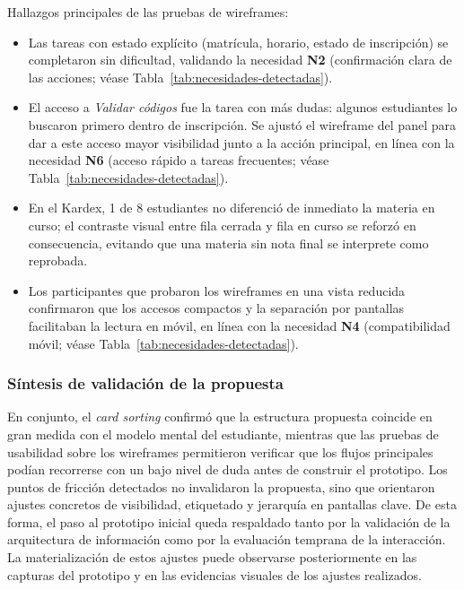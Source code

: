\noindent Hallazgos principales de las pruebas de wireframes:

\begin{itemize}
  \item Las tareas con estado explícito (matrícula, horario, estado de inscripción) se completaron sin dificultad, validando la necesidad \textbf{N2} (confirmación clara de las acciones; véase Tabla~\ref{tab:necesidades-detectadas}).
  \item El acceso a \textit{Validar códigos} fue la tarea con más dudas: algunos estudiantes lo buscaron primero dentro de inscripción. Se ajustó el wireframe del panel para dar a este acceso mayor visibilidad junto a la acción principal, en línea con la necesidad \textbf{N6} (acceso rápido a tareas frecuentes; véase Tabla~\ref{tab:necesidades-detectadas}).
  \item En el Kardex, 1 de 8 estudiantes no diferenció de inmediato la materia en curso; el contraste visual entre fila cerrada y fila en curso se reforzó en consecuencia, evitando que una materia sin nota final se interprete como reprobada.
  \item Los participantes que probaron los wireframes en una vista reducida confirmaron que los accesos compactos y la separación por pantallas facilitaban la lectura en móvil, en línea con la necesidad \textbf{N4} (compatibilidad móvil; véase Tabla~\ref{tab:necesidades-detectadas}).
\end{itemize}

\subsubsection*{Síntesis de validación de la propuesta}

En conjunto, el \textit{card sorting} confirmó que la estructura propuesta coincide en gran medida con el modelo mental del estudiante, mientras que las pruebas de usabilidad sobre los wireframes permitieron verificar que los flujos principales podían recorrerse con un bajo nivel de duda antes de construir el prototipo. Los puntos de fricción detectados no invalidaron la propuesta, sino que orientaron ajustes concretos de visibilidad, etiquetado y jerarquía en pantallas clave. De esta forma, el paso al prototipo inicial queda respaldado tanto por la validación de la arquitectura de información como por la evaluación temprana de la interacción. La materialización de estos ajustes puede observarse posteriormente en las capturas del prototipo y en las evidencias visuales de los ajustes realizados.

